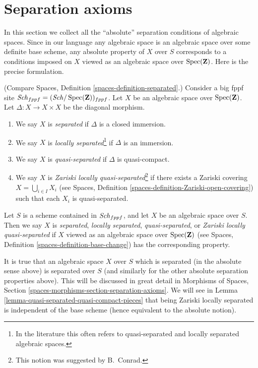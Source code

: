 \section{Separation axioms}
\label{section-separation}

\noindent
In this section we collect all the ``absolute'' separation conditions
of algebraic spaces. Since in our language any algebraic space is an
algebraic space over some definite base scheme, any absolute property
of $X$ over $S$ corresponds to a conditions imposed on $X$ viewed
as an algebraic space over $\mathop{\mathrm{Spec}}(\mathbf{Z})$. Here is the
precise formulation.

\begin{definition}
\label{definition-separated}
(Compare Spaces, Definition \ref{spaces-definition-separated}.)
Consider a big fppf site
$\mathit{Sch}_{fppf} = (\mathit{Sch}/\mathop{\mathrm{Spec}}(\mathbf{Z}))_{fppf}$.
Let $X$ be an algebraic space over
$\mathop{\mathrm{Spec}}(\mathbf{Z})$. Let $\Delta : X \to X \times X$
be the diagonal morphism.
\begin{enumerate}
\item We say $X$ is {\it separated} if $\Delta$ is a closed immersion.
\item We say $X$ is {\it locally separated}\footnote{In the
literature this often refers to quasi-separated and locally
separated algebraic spaces.} if $\Delta$ is an
immersion.
\item We say $X$ is {\it quasi-separated} if $\Delta$ is quasi-compact.
\item We say $X$ is {\it Zariski locally quasi-separated}\footnote{
This notion was suggested by B.\ Conrad.} if there
exists a Zariski covering $X = \bigcup_{i \in I} X_i$ (see Spaces,
Definition \ref{spaces-definition-Zariski-open-covering}) such that
each $X_i$ is quasi-separated.
\end{enumerate}
Let $S$ is a scheme contained in $\mathit{Sch}_{fppf}$, and let
$X$ be an algebraic space over $S$. Then we say $X$ is {\it separated},
{\it locally separated}, {\it quasi-separated}, or
{\it Zariski locally quasi-separated}
if $X$ viewed as an algebraic space over $\mathop{\mathrm{Spec}}(\mathbf{Z})$ (see
Spaces, Definition \ref{spaces-definition-base-change})
has the corresponding property.
\end{definition}

\noindent
It is true that an algebraic space $X$ over $S$ which is separated
(in the absolute sense above) is separated over $S$ (and similarly
for the other absolute separation properties above). This will be discussed
in great detail in
Morphisms of Spaces, Section \ref{spaces-morphisms-section-separation-axioms}.
We will see in
Lemma \ref{lemma-quasi-separated-quasi-compact-pieces}
that being Zariski locally separated is independent of the base scheme
(hence equivalent to the absolute notion).

